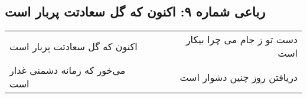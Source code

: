 \begin{center}
\section*{رباعی شماره ۹: اکنون که گل سعادتت پربار است}
\label{sec:sh009}
\begin{longtable}{l p{0.5cm} r}
اکنون که گل سعادتت پربار است
&&
دست تو ز جام می چرا بیکار است
\\
می‌خور که زمانه دشمنی غدار است
&&
دریافتن روز چنین دشوار است
\\
\end{longtable}
\end{center}
